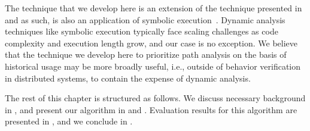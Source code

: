The technique that we develop here is an extension of the technique
presented in  and as such, is also an application of
symbolic execution~\cite{boyer75:select}. Dynamic analysis techniques
like symbolic execution typically face scaling challenges as code
complexity and execution length grow, and our case is no exception.
We believe that the technique we develop here to prioritize path
analysis on the basis of historical usage may be more broadly useful,
i.e., outside of behavior verification in distributed systems, to
contain the expense of dynamic analysis.


The rest of this chapter is structured as follows.  We discuss
necessary background in , and present our algorithm
in  and .  Evaluation
results for this algorithm are presented in , and we
conclude in .


